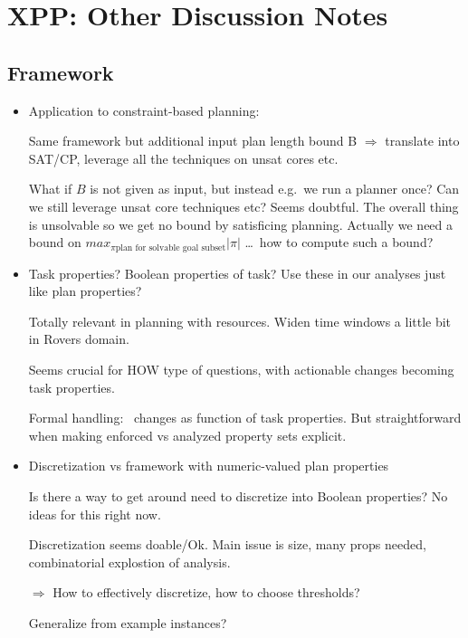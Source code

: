 \section{XPP: Other Discussion Notes}
\label{xpp-discussion}





\subsection{Framework}

\begin{itemize}
\item Application to constraint-based planning: 

  Same framework but additional input plan length bound B
  $\Rightarrow$ translate into SAT/CP, leverage all the techniques on
  unsat cores etc.

  What if $B$ is not given as input, but instead e.g.\ we run a
  planner once? Can we still leverage unsat core techniques etc? Seems
  doubtful. The overall thing is unsolvable so we get no bound by
  satisficing planning. Actually we need a bound on $max_{\pi \mbox{
      plan for solvable goal subset}} |\pi|$ \dots\ how to compute
  such a bound?

\item Task properties? Boolean properties of task? Use these in our
  analyses just like plan properties?

  Totally relevant in planning with resources. Widen time windows a
  little bit in Rovers domain. 

  Seems crucial for HOW type of questions, with actionable changes
  becoming task properties.

  Formal handling: \plans\ changes as function of task properties. But
  straightforward when making enforced vs analyzed property sets
  explicit.

\item Discretization vs framework with numeric-valued plan properties

  Is there a way to get around need to discretize into Boolean
  properties? No ideas for this right now. 

  Discretization seems doable/Ok. Main issue is size, many props
  needed, combinatorial explostion of analysis. 

  $\Rightarrow$ How to effectively discretize, how to choose
  thresholds?

  Generalize from example instances?


\end{itemize}
